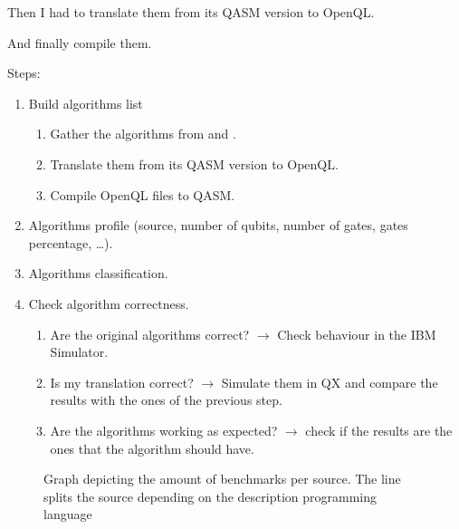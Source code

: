 Then I had to translate them from its QASM version to OpenQL.

And finally compile them.


Steps:

\begin{enumerate}
\item Build algorithms list       
\begin{enumerate}
\item Gather the algorithms from \cite{zulehner17:effic_method_mappin_quant_circuit} and \cite{Lin_2014}.
\item Translate them from its QASM version to OpenQL.
\item Compile OpenQL files to QASM.
\end{enumerate}
\item Algorithms profile (source, number of qubits, number of gates, gates percentage, \ldots{}).
\item Algorithms classification.
\item Check algorithm correctness.
\begin{enumerate}
\item Are the original algorithms correct? \(\to\) Check behaviour in the IBM Simulator.
\item Is my translation correct? \(\to\) Simulate them in QX and compare the results with the ones of the previous step.
\item Are the algorithms working as expected? \(\to\) check if the results are the ones that the algorithm should have.
\end{enumerate}
\end{enumerate}

\begin{figure}
\centering
{}
\label{fig:benchmarks_graph}
\caption{Graph depicting the amount of benchmarks per source. The line splits the source depending on the description programming language}
\end{figure}


